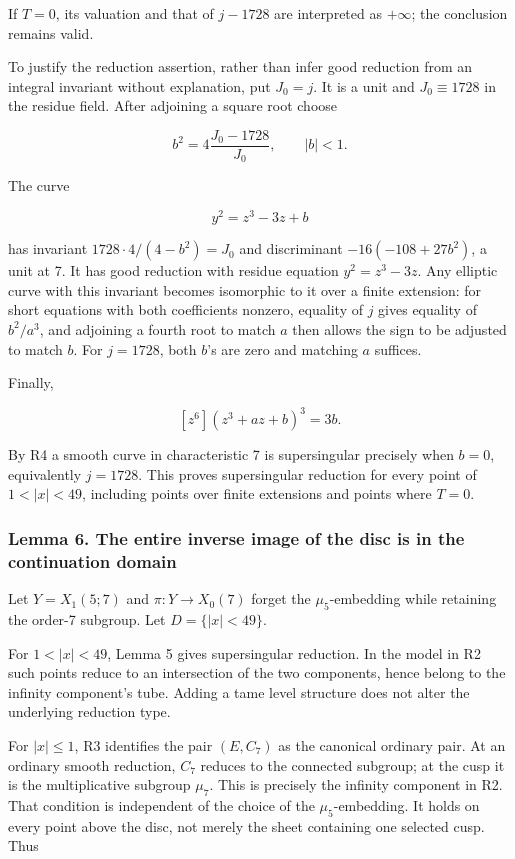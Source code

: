 \documentclass[11pt,a4paper]{article}
\begin{document}
If \(T=0\), its valuation and that of \(j-1728\) are interpreted as \(+\infty\); the conclusion remains valid.

To justify the reduction assertion, rather than infer good reduction from an integral invariant without explanation, put \(J_0=j\). It is a unit and \(J_0\equiv1728\) in the residue field. After adjoining a square root choose

\[
b^2=4\frac{J_0-1728}{J_0},\qquad |b|<1.
\]

The curve

\[
y^2=z^3-3z+b
\]

has invariant \(1728\cdot4/(4-b^2)=J_0\) and discriminant \(-16(-108+27b^2)\), a unit at 7. It has good reduction with residue equation \(y^2=z^3-3z\). Any elliptic curve with this invariant becomes isomorphic to it over a finite extension: for short equations with both coefficients nonzero, equality of \(j\) gives equality of \(b^2/a^3\), and adjoining a fourth root to match \(a\) then allows the sign to be adjusted to match \(b\). For \(j=1728\), both \(b\)'s are zero and matching \(a\) suffices.

Finally,

\[
[z^6](z^3+az+b)^3=3b.
\]

By R4 a smooth curve in characteristic 7 is supersingular precisely when \(b=0\), equivalently \(j=1728\). This proves supersingular reduction for every point of \(1<|x|<49\), including points over finite extensions and points where \(T=0\).

\hypertarget{lemma-6.-the-entire-inverse-image-of-the-disc-is-in-the-continuation-domain}{%
\subsubsection{Lemma 6. The entire inverse image of the disc is in the continuation domain}\label{lemma-6.-the-entire-inverse-image-of-the-disc-is-in-the-continuation-domain}}

Let \(Y=X_1(5;7)\) and \(\pi:Y\to X_0(7)\) forget the \(\mu_5\)-embedding while retaining the order-7 subgroup. Let \(D=\{|x|<49\}\).

For \(1<|x|<49\), Lemma 5 gives supersingular reduction. In the model in R2 such points reduce to an intersection of the two components, hence belong to the infinity component's tube. Adding a tame level structure does not alter the underlying reduction type.

For \(|x|\le1\), R3 identifies the pair \((E,C_7)\) as the canonical ordinary pair. At an ordinary smooth reduction, \(C_7\) reduces to the connected subgroup; at the cusp it is the multiplicative subgroup \(\mu_7\). This is precisely the infinity component in R2. That condition is independent of the choice of the \(\mu_5\)-embedding. It holds on every point above the disc, not merely the sheet containing one selected cusp. Thus
\end{document}
